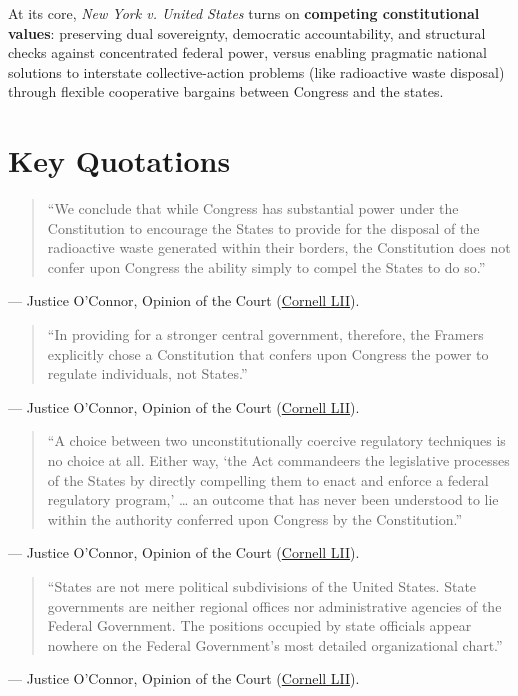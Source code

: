 \documentclass[12pt]{article}
\begin{document}
At its core, \textit{New York v. United States} turns on \textbf{competing constitutional values}: preserving dual sovereignty, democratic accountability, and structural checks against concentrated federal power, versus enabling pragmatic national solutions to interstate collective-action problems (like radioactive waste disposal) through flexible cooperative bargains between Congress and the states.

\section{Key Quotations}

\begin{quote}
``We conclude that while Congress has substantial power under the Constitution to encourage the States to provide for the disposal of the radioactive waste generated within their borders, the Constitution does not confer upon Congress the ability simply to compel the States to do so.''
\end{quote}
\noindent --- Justice O'Connor, Opinion of the Court (\href{https://www.law.cornell.edu/supremecourt/text/505/144}{Cornell LII}).

\begin{quote}
``In providing for a stronger central government, therefore, the Framers explicitly chose a Constitution that confers upon Congress the power to regulate individuals, not States.''
\end{quote}
\noindent --- Justice O'Connor, Opinion of the Court (\href{https://www.law.cornell.edu/supremecourt/text/505/144}{Cornell LII}).

\begin{quote}
``A choice between two unconstitutionally coercive regulatory techniques is no choice at all. Either way, `the Act commandeers the legislative processes of the States by directly compelling them to enact and enforce a federal regulatory program,' \dots{} an outcome that has never been understood to lie within the authority conferred upon Congress by the Constitution.''
\end{quote}
\noindent --- Justice O'Connor, Opinion of the Court (\href{https://www.law.cornell.edu/supremecourt/text/505/144}{Cornell LII}).

\begin{quote}
``States are not mere political subdivisions of the United States. State governments are neither regional offices nor administrative agencies of the Federal Government. The positions occupied by state officials appear nowhere on the Federal Government's most detailed organizational chart.''
\end{quote}
\noindent --- Justice O'Connor, Opinion of the Court (\href{https://www.law.cornell.edu/supremecourt/text/505/144}{Cornell LII}).
\end{document}
